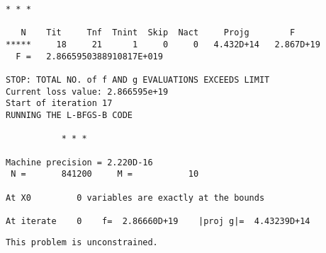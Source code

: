 \documentclass[11pt]{article}
\begin{document}
\begin{Verbatim}[commandchars=\\\{\}]
           * * *

   N    Tit     Tnf  Tnint  Skip  Nact     Projg        F
*****     18     21      1     0     0   4.432D+14   2.867D+19
  F =   2.8665950388910817E+019

STOP: TOTAL NO. of f AND g EVALUATIONS EXCEEDS LIMIT
Current loss value: 2.866595e+19
Start of iteration 17
RUNNING THE L-BFGS-B CODE

           * * *

Machine precision = 2.220D-16
 N =       841200     M =           10

At X0         0 variables are exactly at the bounds

At iterate    0    f=  2.86660D+19    |proj g|=  4.43239D+14
    \end{Verbatim}

    \begin{Verbatim}[commandchars=\\\{\}]
 This problem is unconstrained.
    \end{Verbatim}
\end{document}
